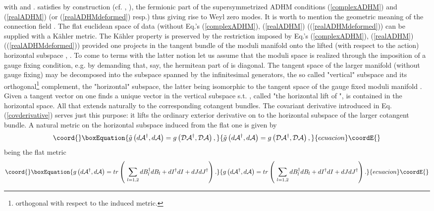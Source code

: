 \documentclass[a4paper,12pt]{article}
\begin{document}
with \coordHE{} and \coordHE{}. \coordHE{} satisfies by construction (cf. \cite{FPS1}, \cite{FPS2}), the
fermionic part of the supersymmetrized ADHM conditions
(\ref{complexADHM}) and (\ref{realADHM}) (or
(\ref{realADHMdeformed}) resp.) thus giving rise to Weyl zero
modes. It is worth to mention the geometric meaning of the \coordHE{}
connection field \coordHE{}. The flat euclidean space of data \coordHE{}
(without Eq.'s (\ref{complexADHM}), (\ref{realADHM})
((\ref{realADHMdeformed})) can be supplied with a K\"{a}hler
metric. The K\"{a}hler property is preserved by the restriction
imposed by Eq.'s (\ref{complexADHM}), (\ref{realADHM})
((\ref{realADHMdeformed})) provided one projects in the tangent
bundle of the moduli manifold onto the lifted (with respect to the
\coordHE{} action) horizontal subspace \cite{HKLR}, \cite{BF}. To come
to terms with the latter notion let us assume that the moduli
space is realized through the imposition of a gauge fixing
condition, e.g. by demanding that, say, the hermitean part of
\coordHE{} is diagonal. The tangent space of the larger manifold
(without gauge fixing) may be decomposed into the subspace spanned
by the infinitesimal \coordHE{} generators, the so called "vertical"
subspace and its orthogonal\footnote{orthogonal with respect to
the induced metric.} complement, the "horizontal" subspace, the
latter being isomorphic to the tangent space of the gauge fixed
moduli manifold \coordHE{}. Given a tangent vector \coordHE{} on \coordHE{} one finds a unique vector \coordHE{} in the vertical subspace s.t.
\coordHE{}, called "the horizontal lift of \coordHE{}", is contained in the
horizontal space. All that extends naturally to the corresponding
cotangent bundles. The covariant derivative introduced in Eq.
(\ref{covderivative}) serves just this purpose: it lifts the
ordinary exterior derivative on \coordHE{} to the horizontal
subspace of the larger cotangent bundle. A natural metric \coordHE{} on the horizontal subspace induced from the flat one is given
by
\begin{equation}\coord{}\boxEquation{
{\tilde g}\left(d {\cal A}^{\dagger}, d {\cal A}\right)=g \left({\cal D} {\cal A}^{\dagger}, {\cal D} {\cal
A}\right),
}{
{\tilde g}\left(d {\cal A}^{\dagger}, d {\cal A}\right)=g \left({\cal D} {\cal A}^{\dagger}, {\cal D} {\cal
A}\right),
}{ecuacion}\coordE{}\end{equation}
\coordHE{} being the flat metric
\begin{equation}\coord{}\boxEquation{
g\left(d {\cal A}^{\dagger}, d {\cal A}\right)=tr \left( \, \,  \sum_{l=1,2} dB_l^{\dagger} dB_l +dI^{\dagger}
dI+dJ dJ^{\dagger}\right).
}{
g\left(d {\cal A}^{\dagger}, d {\cal A}\right)=tr \left( \, \,  \sum_{l=1,2} dB_l^{\dagger} dB_l +dI^{\dagger}
dI+dJ dJ^{\dagger}\right).
}{ecuacion}\coordE{}\end{equation}
\end{document}
